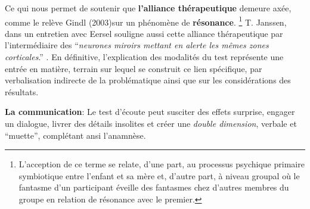  
Ce qui nous permet de soutenir que 
 \textbf{l'alliance thérapeutique} demeure axée, comme le relève Gindl
 (2003)\autocite {gindl}sur 
 un phénomène de \textbf{résonance}. \footnote{L'acception de ce terme se relate, d'une part, au processus psychique
primaire symbiotique entre l'enfant et sa mère et, d'autre part, à
niveau groupal où le fantasme d'un participant éveille des fantasmes chez d'autres membres du groupe en relation
de résonance  avec le premier\autocite {doronparot}.}
T. Janssen, dans un entretien
avec Eersel
souligne aussi cette alliance thérapeutique
par l'intermédiaire des ``\textit{neurones
 miroirs mettant en alerte les mêmes zones corticales}.'' \autocite[203]{van_eersel_cerveau}.
En définitive, l'explication des modalités du test représente une
  entrée en matière, terrain  sur lequel se construit ce lien spécifique, 
  par verbalisation indirecte de la problématique ainsi que sur 
  les considérations des résultats.
  
  
   

  
\textbf{La communication}:
  Le test d'écoute 
  peut susciter des effets surprise, engager un dialogue, livrer des détails
 insolites et créer une \textit{double dimension}, verbale et 
 ``muette'', complétant ansi l'anamnèse.
 


